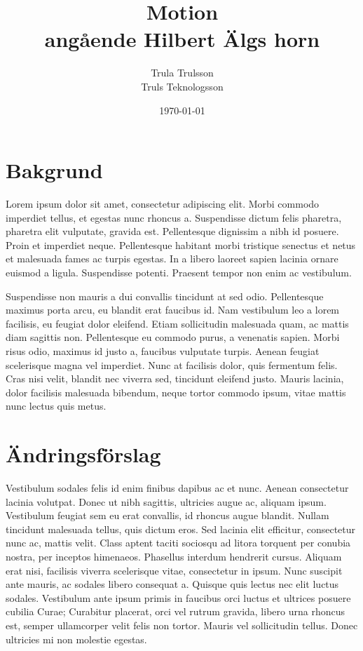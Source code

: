 \documentclass[proposition]{fclass}
\date{\today}
\author{Trula Trulsson\\
		Truls Teknologsson} %
\title{Motion \\
	\normalsize{angående Hilbert Älgs horn}} %
\begin{document}

\section*{Bakgrund} 

Lorem ipsum dolor sit amet, consectetur adipiscing elit. Morbi commodo imperdiet tellus, et egestas nunc rhoncus a. Suspendisse dictum felis pharetra, pharetra elit vulputate, gravida est. Pellentesque dignissim a nibh id posuere. Proin et imperdiet neque. Pellentesque habitant morbi tristique senectus et netus et malesuada fames ac turpis egestas. In a libero laoreet sapien lacinia ornare euismod a ligula. Suspendisse potenti. Praesent tempor non enim ac vestibulum.

Suspendisse non mauris a dui convallis tincidunt at sed odio. Pellentesque maximus porta arcu, eu blandit erat faucibus id. Nam vestibulum leo a lorem facilisis, eu feugiat dolor eleifend. Etiam sollicitudin malesuada quam, ac mattis diam sagittis non. Pellentesque eu commodo purus, a venenatis sapien. Morbi risus odio, maximus id justo a, faucibus vulputate turpis. Aenean feugiat scelerisque magna vel imperdiet. Nunc at facilisis dolor, quis fermentum felis. Cras nisi velit, blandit nec viverra sed, tincidunt eleifend justo. Mauris lacinia, dolor facilisis malesuada bibendum, neque tortor commodo ipsum, vitae mattis nunc lectus quis metus.

\section*{Ändringsförslag}

Vestibulum sodales felis id enim finibus dapibus ac et nunc. Aenean consectetur lacinia volutpat. Donec ut nibh sagittis, ultricies augue ac, aliquam ipsum. Vestibulum feugiat sem eu erat convallis, id rhoncus augue blandit. Nullam tincidunt malesuada tellus, quis dictum eros. Sed lacinia elit efficitur, consectetur nunc ac, mattis velit. Class aptent taciti sociosqu ad litora torquent per conubia nostra, per inceptos himenaeos. Phasellus interdum hendrerit cursus. Aliquam erat nisi, facilisis viverra scelerisque vitae, consectetur in ipsum. Nunc suscipit ante mauris, ac sodales libero consequat a. Quisque quis lectus nec elit luctus sodales. Vestibulum ante ipsum primis in faucibus orci luctus et ultrices posuere cubilia Curae; Curabitur placerat, orci vel rutrum gravida, libero urna rhoncus est, semper ullamcorper velit felis non tortor. Mauris vel sollicitudin tellus. Donec ultricies mi non molestie egestas.
\end{document}
